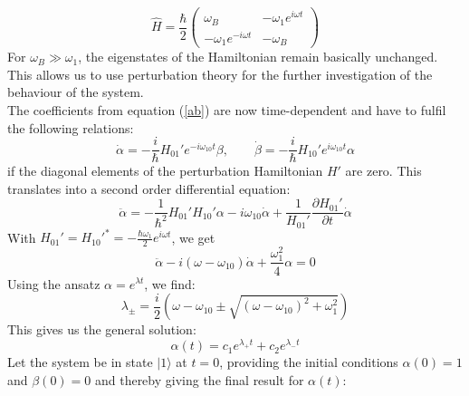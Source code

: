 \documentclass[12pt,a4paper]{article}
\begin{document}
\begin{equation}
\hat{H}=\frac{\hbar}{2}\left(\begin{matrix}
\omega_{B}&-\omega_1e^{i\omega t}\\
-\omega_1e^{-i\omega t}&-\omega_ {B}
\end{matrix}\right)
\end{equation}
For $\omega_{B}\gg\omega_1$, the eigenstates of the Hamiltonian remain basically unchanged. This allows us to use perturbation theory for the further investigation of the behaviour of the system. \\
The coefficients from equation (\ref{ab}) are now time-dependent and have to fulfil the following relations\cite{qmg}:
\begin{equation}
\dot{\alpha}=-\frac{i}{\hbar}H_{01}'e^{-i\omega_{10}t}\beta,\qquad\dot{\beta}=-\frac{i}{\hbar}H_{10}'e^{i\omega_{10}t}\alpha
\end{equation}
if the diagonal elements of the perturbation Hamiltonian $H'$ are zero. This translates into a second order differential equation:
\begin{equation}
\ddot{\alpha}=-\frac{1}{\hbar^2}H_{01}'H_{10}'\alpha-i\omega_{10}\dot{\alpha}+\frac{1}{H_{01}'}\frac{\partial H_{01}'}{\partial t}\dot{\alpha}
\end{equation}
With $H_{01}'=H_{10}'^*=-\frac{\hbar\omega_1}{2}e^{i\omega t}$, we get
\begin{equation}
\ddot{\alpha}-i(\omega-\omega_{10})\dot{\alpha}+\frac{\omega_1^2}{4}\alpha=0
\end{equation}
Using the ansatz $\alpha=e^{\lambda t}$, we find:
\begin{equation}
\lambda_{\pm}=\frac{i}{2}\left(\omega-\omega_{10}\pm\sqrt{(\omega-\omega_{10})^2+\omega_1^2}\right)
\end{equation}
This gives us the general solution:
\begin{equation}
\alpha(t)=c_1e^{\lambda_+t}+c_2e^{\lambda_-t}
\end{equation}
Let the system be in state $|1\rangle$ at $t=0$, providing the initial conditions $\alpha(0)=1$ and $\beta(0)=0$ and thereby giving the final result for $\alpha(t)$:
\end{document}
